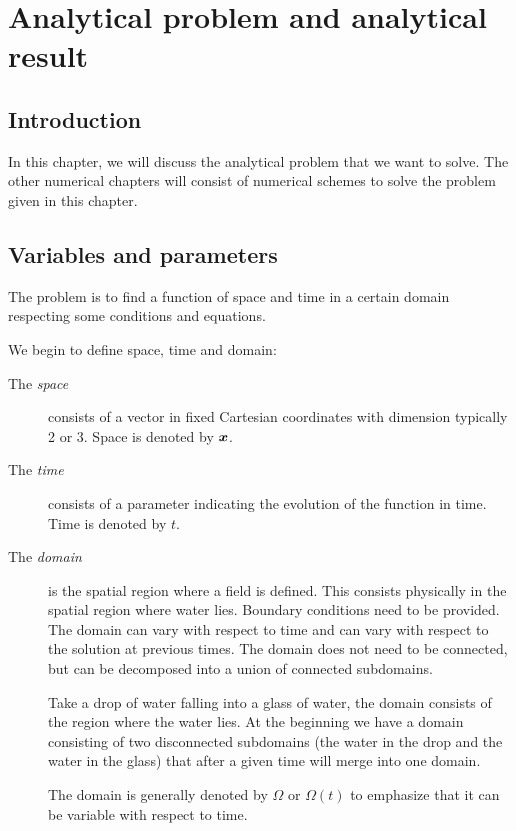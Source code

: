 \chapter{Analytical problem and analytical result}

\minitoc
\section*{Introduction}
In this chapter, we will discuss the analytical problem that we want to solve.
The other numerical chapters will consist of numerical schemes to solve the problem given in this chapter.

\section{Variables and parameters}

The problem is to find a function of space and time in a certain domain respecting some conditions and equations.

We begin to define space, time and domain:
\begin{description}
\item[The \emph{space}] consists of a vector in fixed Cartesian coordinates with dimension typically 2 or 3.
Space is denoted by ${\boldsymbol {x}}$.
\item[The \emph{time}] consists of a parameter indicating the evolution of the function in time.
Time is denoted by $t$.
\item[The \emph{domain}] is the spatial region where a field is defined. This consists physically in the spatial region where water lies.
Boundary conditions need to be provided.
The domain can vary with respect to time and can vary with respect to the solution at previous times.
The domain does not need to be connected, but can be decomposed into a union of connected subdomains.

\begin{example}
 Take a drop of water falling into a glass of water, the domain consists of the region where the water lies.
 At the beginning we have a domain consisting of two disconnected subdomains (the water in the drop and the water in the glass)
 that after a given time will merge into one domain.
\end{example}

The domain is generally denoted by $\Omega$ or $\Omega(t)$ to emphasize that it can be variable with respect to time.
\end{description}

